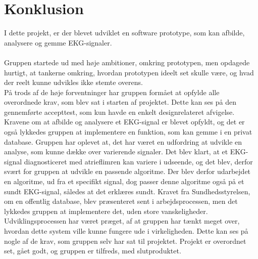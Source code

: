 \chapter{Konklusion}
I dette projekt, er der blevet udviklet en software prototype, som kan afbilde, analysere og gemme EKG-signaler. \\\\
Gruppen startede ud med høje ambitioner, omkring prototypen, men opdagede hurtigt, at tankerne omkring, hvordan prototypen ideelt set skulle være, og hvad der reelt kunne udvikles ikke stemte overens. \\
På trods af de høje forventninger har gruppen formået at opfylde alle overordnede krav, som blev sat i starten af projektet. Dette kan ses på den gennemførte accepttest, som kun havde en enkelt designrelateret afvigelse. Kravene om at afbilde og analysere et EKG-signal er blevet opfyldt, og det er også lykkedes gruppen at implementere en funktion, som kan gemme i en privat database. 
Gruppen har oplevet at, det har været en udfordring at udvikle en analyse, som kunne dække over varierende signaler. Det blev klart, at et EKG-signal diagnosticeret med atrieflimren kan variere i udseende, og det blev, derfor svært for gruppen at udvikle en passende algoritme. Der blev derfor udarbejdet en algoritme, ud fra et specifikt signal, dog passer denne algoritme også på et sundt EKG-signal, således at det erklæres sundt. 
Kravet fra Sundhedsstyrelsen, om en offentlig database, blev præsenteret sent i arbejdsprocessen, men det lykkedes gruppen at implementere det, uden store vanskeligheder. 
Udviklingsprocessen har været præget, af at gruppen har tænkt meget over, hvordan dette system ville kunne fungere ude i virkeligheden. Dette kan ses på nogle af de krav, som gruppen selv har sat til projektet. 
Projekt er overordnet set, gået godt, og gruppen er tilfreds, med slutproduktet.

